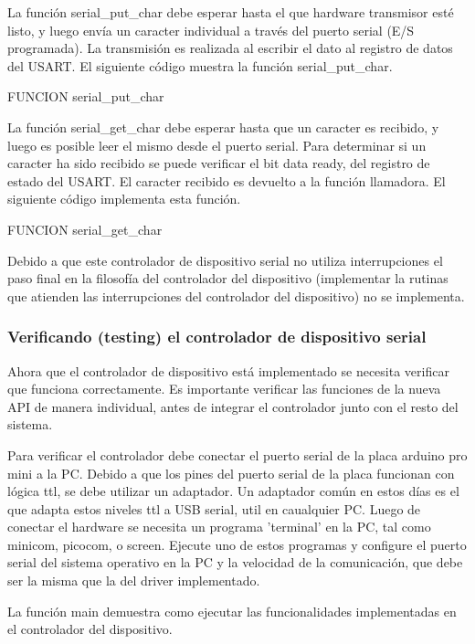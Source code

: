 \documentclass[12pt]{article}
\begin{document}
La función serial\_put\_char debe esperar hasta el que hardware
transmisor esté listo, y 
luego envía un caracter individual a través del puerto serial (E/S programada).
La
transmisión es realizada al escribir el dato al registro de datos del USART.
El siguiente código muestra la función serial\_put\_char.

FUNCION serial\_put\_char


La función serial\_get\_char debe esperar hasta que un caracter es recibido, y 
luego es posible leer el mismo desde el puerto serial. 
Para determinar si un caracter ha sido recibido se puede verificar
el bit data ready, del registro de estado del USART. El caracter
recibido es devuelto a la función llamadora. 
El siguiente código implementa esta función.

FUNCION serial\_get\_char

Debido a que este controlador de dispositivo serial no utiliza interrupciones
el paso final en la filosofía del controlador del dispositivo (implementar
la rutinas que atienden las interrupciones del controlador del dispositivo)
no se implementa.


\subsubsection *{Verificando (testing) el controlador de dispositivo serial}

Ahora que el controlador de dispositivo está implementado se necesita verificar
que funciona correctamente. Es importante verificar las funciones de la nueva
API de manera individual, 
antes de integrar el controlador junto con el resto del sistema.

Para verificar el controlador debe conectar el puerto serial de la placa
arduino pro mini a la PC. Debido a que los pines del puerto serial de la placa
funcionan con lógica ttl, se debe utilizar un adaptador. Un adaptador
común en estos días es el que adapta estos niveles ttl a USB serial, util 
en caualquier PC.
Luego de conectar el hardware se necesita un programa 'terminal' en la PC, tal
como minicom, picocom, o screen. Ejecute uno de estos programas
y configure el puerto serial del sistema operativo en la PC y la
velocidad de la comunicación, que debe ser la misma que la del driver 
implementado.

La función main demuestra como ejecutar las funcionalidades implementadas
en el controlador del dispositivo.
\end{document}
